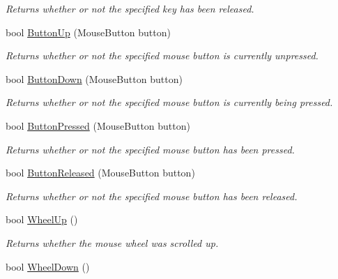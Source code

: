 \begin{DoxyCompactItemize}
\begin{DoxyCompactList}\small\item\em Returns whether or not the specified key has been released. \end{DoxyCompactList}\item 
bool \hyperlink{class_tri_devs_1_1_tri_engine2_d_1_1_input_1_1_input_manager_ac1318f8216ea7fee07193a00c664e011}{Button\-Up} (Mouse\-Button button)
\begin{DoxyCompactList}\small\item\em Returns whether or not the specified mouse button is currently unpressed. \end{DoxyCompactList}\item 
bool \hyperlink{class_tri_devs_1_1_tri_engine2_d_1_1_input_1_1_input_manager_abead1a71779c1338c64c0ff87f73b324}{Button\-Down} (Mouse\-Button button)
\begin{DoxyCompactList}\small\item\em Returns whether or not the specified mouse button is currently being pressed. \end{DoxyCompactList}\item 
bool \hyperlink{class_tri_devs_1_1_tri_engine2_d_1_1_input_1_1_input_manager_a78f38771f8ae3e3d6a9bfaca7dc7579d}{Button\-Pressed} (Mouse\-Button button)
\begin{DoxyCompactList}\small\item\em Returns whether or not the specified mouse button has been pressed. \end{DoxyCompactList}\item 
bool \hyperlink{class_tri_devs_1_1_tri_engine2_d_1_1_input_1_1_input_manager_a74d138767f317687d444a79ea73f321c}{Button\-Released} (Mouse\-Button button)
\begin{DoxyCompactList}\small\item\em Returns whether or not the specified mouse button has been released. \end{DoxyCompactList}\item 
bool \hyperlink{class_tri_devs_1_1_tri_engine2_d_1_1_input_1_1_input_manager_a5f8ea7daefda14c2dfa098dc1274e59c}{Wheel\-Up} ()
\begin{DoxyCompactList}\small\item\em Returns whether the mouse wheel was scrolled up. \end{DoxyCompactList}\item 
bool \hyperlink{class_tri_devs_1_1_tri_engine2_d_1_1_input_1_1_input_manager_a7e1354a24c39eb196294b067812befc1}{Wheel\-Down} ()

\end{DoxyCompactItemize}
